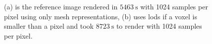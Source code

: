 \begin{figure}[t]
\begin{subfigure}[b]{\linewidth}
{        }
        \caption{}
        \label{fig:render_comparison_mesh}
    \end{subfigure}
    \begin{subfigure}[b]{\linewidth}
        \caption{}
        \label{fig:render_comparison_lod}
    \end{subfigure}
	\caption[Comparison between mesh and volume renderings of the forest]{(a) is the reference image rendered in $\SI{5463}{\s}$ with 1024 samples per pixel using only mesh representations, (b) uses \acsp{lod} if a voxel is smaller than a pixel and took $\SI{8723}{\s}$ to render with 1024 samples per pixel.}
	\label{fig:render_comparison}
\end{figure}
